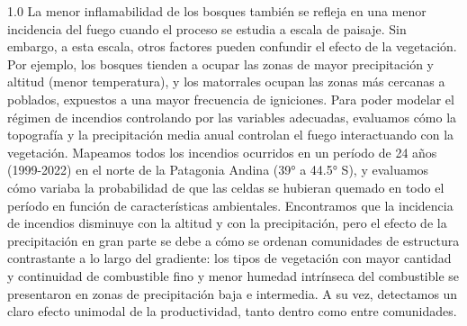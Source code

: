 \begin{spacing}{1.0}
La menor inflamabilidad de los bosques también se refleja en una menor incidencia del fuego cuando el proceso se estudia a escala de paisaje. Sin embargo, a esta escala, otros factores pueden confundir el efecto de la vegetación. Por ejemplo, los bosques tienden a ocupar las zonas de mayor precipitación y altitud (menor temperatura), y los matorrales ocupan las zonas más cercanas a poblados, expuestos a una mayor frecuencia de igniciones. Para poder modelar el régimen de incendios controlando por las variables adecuadas, evaluamos cómo la topografía y la precipitación media anual controlan el fuego interactuando con la vegetación. Mapeamos todos los incendios ocurridos en un período de 24 años (1999-2022) en el norte de la Patagonia Andina (39° a 44.5° S), y evaluamos cómo variaba la probabilidad de que las celdas se hubieran quemado en todo el período en función de características ambientales. Encontramos que la incidencia de incendios disminuye con la altitud y con la precipitación, pero el efecto de la precipitación en gran parte se debe a cómo se ordenan comunidades de estructura contrastante a lo largo del gradiente: los tipos de vegetación con mayor cantidad y continuidad de combustible fino y menor humedad intrínseca del combustible se presentaron en zonas de precipitación baja e intermedia. A su vez, detectamos un claro efecto unimodal de la productividad, tanto dentro como entre comunidades. 


\end{spacing}
